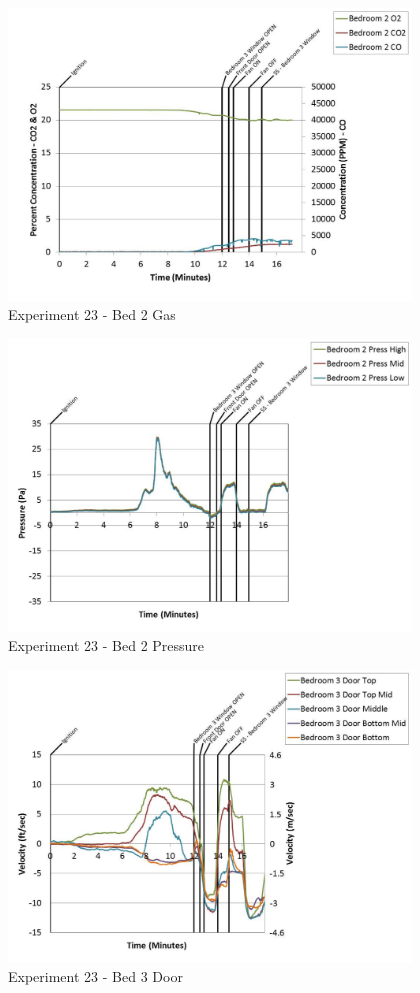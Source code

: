 \documentclass{article}
\begin{document}
\begin{appendices}
	\begin{figure}[h!]
		\centering
		\includegraphics[height=3.05in]{0_Images/Results_Charts/Exp_23_Charts/Bed2Gas.pdf}
		\caption{Experiment 23 - Bed 2 Gas}
	\end{figure}
 
	\clearpage

	\begin{figure}[h!]
		\centering
		\includegraphics[height=3.05in]{0_Images/Results_Charts/Exp_23_Charts/Bed2Pressure.pdf}
		\caption{Experiment 23 - Bed 2 Pressure}
	\end{figure}
 

	\begin{figure}[h!]
		\centering
		\includegraphics[height=3.05in]{0_Images/Results_Charts/Exp_23_Charts/Bed3Door.pdf}
		\caption{Experiment 23 - Bed 3 Door}
	\end{figure}
 

\end{appendices}
\end{document}
